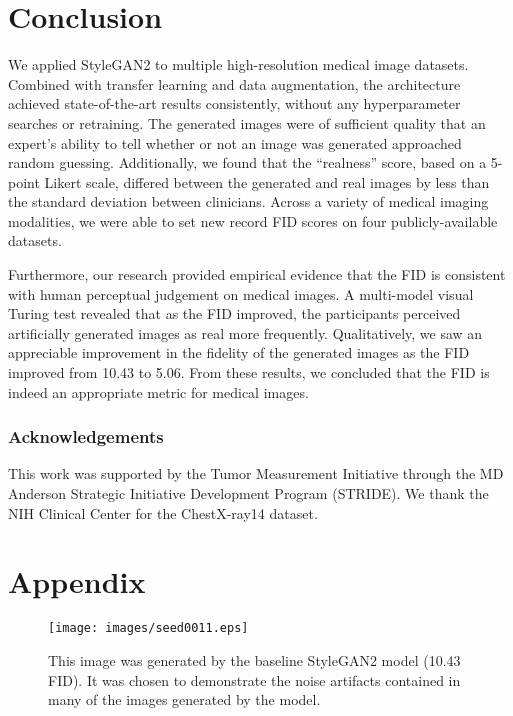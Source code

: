 \documentclass[runningheads]{llncs}
\begin{document}
\section{Conclusion}

We applied StyleGAN2 to multiple high-resolution medical image datasets.
Combined with transfer learning and data augmentation, the architecture achieved state-of-the-art results consistently, without any hyperparameter searches or retraining.
The generated images were of sufficient quality that an expert's ability to tell whether or not an image was generated approached random guessing.
Additionally, we found that the ``realness'' score, based on a 5-point Likert scale, differed between the generated and real images by less than the standard deviation between clinicians.
Across a variety of medical imaging modalities, we were able to set new record FID scores on four publicly-available datasets.

Furthermore, our research provided empirical evidence that the FID is consistent with human perceptual judgement on medical images.
A multi-model visual Turing test revealed that as the FID improved, the participants perceived artificially generated images as real more frequently.
Qualitatively, we saw an appreciable improvement in the fidelity of the generated images as the FID improved from 10.43 to 5.06.
From these results, we concluded that the FID is indeed an appropriate metric for medical images.

\subsubsection{Acknowledgements}

This work was supported by the Tumor Measurement Initiative through the MD Anderson Strategic Initiative Development Program (STRIDE). 
We thank the NIH Clinical Center for the ChestX-ray14 dataset.

\clearpage

\section*{Appendix}

\begin{figure}[h!]
    \centering
    \texttt{[image: images/seed0011.eps]}
    \caption{This image was generated by the baseline StyleGAN2 model (10.43 FID). It was chosen to demonstrate the noise artifacts contained in many of the images generated by the model.}
    \label{fig:noise}
\end{figure}
\end{document}
